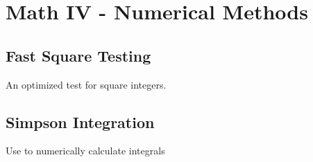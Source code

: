\section{Math IV - Numerical Methods}
  \subsection{Fast Square Testing}
    An optimized test for square integers.
  \subsection{Simpson Integration}
    Use to numerically calculate integrals
